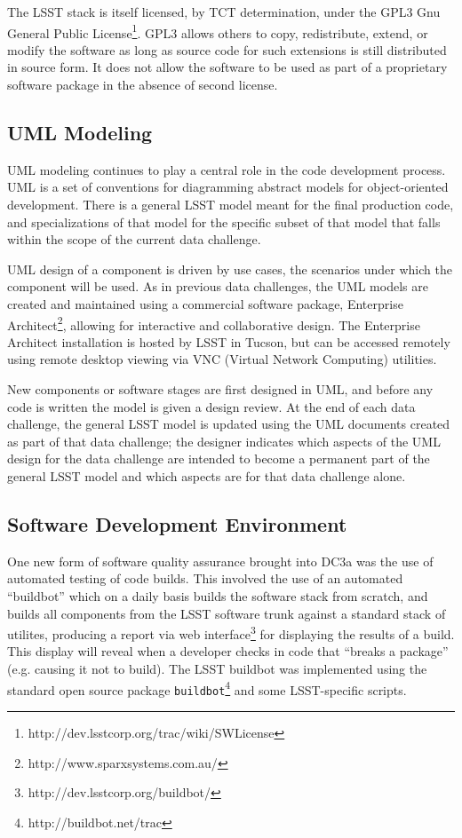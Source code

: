 The LSST stack is itself licensed, by TCT determination, under the GPL3 Gnu
General Public License\footnote{http://dev.lsstcorp.org/trac/wiki/SWLicense}.
GPL3 allows others to copy, redistribute, extend, or modify the software as long
as source code for such extensions is still distributed in source form. It does
not allow the software to be used as part of a proprietary software
package in the absence of second license.   


\subsection{UML Modeling}

UML modeling continues to play a central role in the code development process.
UML is a set of conventions for diagramming abstract models
for object-oriented development. There is a general LSST model meant for the
final production code, and specializations of that model for the specific subset
of that model that falls within the scope of the current data challenge. 

UML design of a component is driven by use cases, the scenarios under which the 
component will be used. As in previous data challenges, the UML models are 
created and maintained using a commercial software package, Enterprise 
Architect\footnote{http://www.sparxsystems.com.au/}, allowing for interactive
and collaborative design. The Enterprise Architect installation is hosted
by LSST in Tucson, but can be accessed remotely using remote desktop viewing
via VNC (Virtual Network Computing) utilities. 

New components or software stages are first designed in UML, and before 
any code is written the model is given a design review. 
At the end of each data challenge, the general LSST model is updated using 
the UML documents created as part of that data challenge; the designer
indicates which aspects of the UML design for the data challenge are intended
to become a permanent part of the general LSST model and which aspects are
for that data challenge alone.


\subsection{Software Development Environment}

One new form of software quality assurance brought into DC3a was the use
of automated testing of code builds. This involved the use of an 
automated ``buildbot'' which on a daily basis builds the software stack 
from scratch, and builds all components from the LSST software trunk against
a standard stack of utilites, producing a report via web 
interface\footnote{http://dev.lsstcorp.org/buildbot/} for displaying the
results of a build.  This display will reveal when a developer checks
in code that ``breaks a package'' (e.g. causing it not to build).  The
LSST buildbot was implemented using the standard open source package
\texttt{buildbot}\footnote{http://buildbot.net/trac} and some
LSST-specific scripts. 

